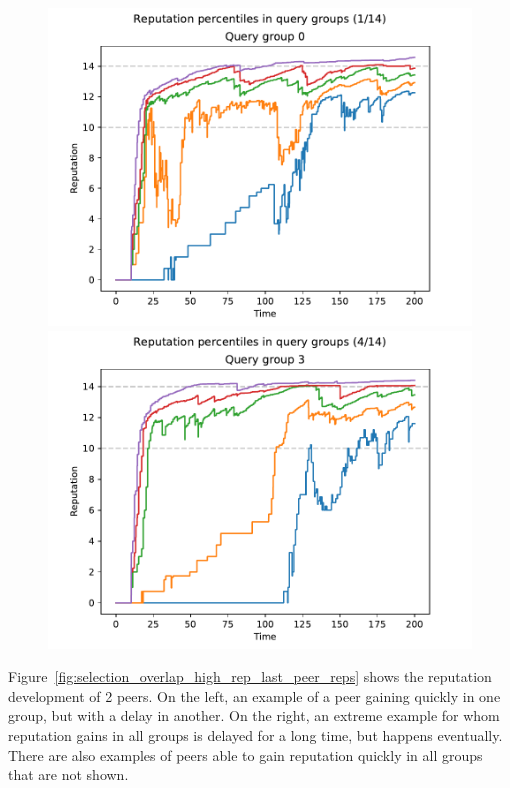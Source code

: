 \begin{figure}[t]
\centering
\includegraphics[width=0.49\columnwidth]{figures/selection_overlap_high_rep_last_rep_percs_1_of_14}
\includegraphics[width=0.49\columnwidth]{figures/selection_overlap_high_rep_last_rep_percs_4_of_14}
\label{fig:selection_overlap_high_rep_last_rep_percs}
\end{figure}

Figure~\ref{fig:selection_overlap_high_rep_last_peer_reps} shows the reputation
development of 2 peers. On the left, an example of a peer gaining quickly in one
group, but with a delay in another. On the right, an extreme example for whom
reputation gains in all groups is delayed for a long time, but happens
eventually. There are also examples of peers able to gain reputation quickly in
all groups that are not shown.

